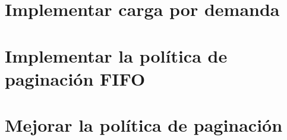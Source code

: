 \section{Implementar carga por demanda}
\section{Implementar la política de paginación FIFO}
\section{Mejorar la política de paginación}